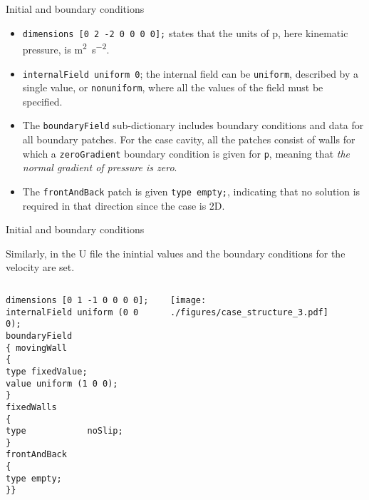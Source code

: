\documentclass{beamer}
\begin{document}
\begin{frame}{Initial and boundary conditions}
\vspace{-0.2cm}
\begin{itemize}
\item \texttt{dimensions [0 2 -2 0 0 0 0];} states that the units of p, here kinematic pressure, is \si{\square\m\per\square\s}.
\item \texttt{internalField uniform 0}; the internal field can be \texttt{uniform}, described by a single value, or \texttt{nonuniform}, where all the values of the field must be specified.
\item The \texttt{boundaryField} sub-dictionary includes boundary conditions and data for all boundary patches. For the case cavity, all the patches consist of walls for which a \texttt{zeroGradient} boundary condition is given for \texttt{p}, meaning that \emph{the normal gradient of pressure is zero}.
\item The \texttt{frontAndBack} patch is given \texttt{type empty;}, indicating that no solution is required in that direction since the case is 2D.
\end{itemize}
\vspace{-0.2cm}


\end{frame}


\begin{frame}[fragile]{Initial and boundary conditions}

Similarly, in the U file the inintial values and the boundary conditions for the velocity are set.
\vspace{-0.3cm}
\begin{columns}[c]
\column{7.0cm} 
\begin{footnotesize}
\begin{verbatim}
dimensions [0 1 -1 0 0 0 0];
internalField uniform (0 0 0);
boundaryField
{ movingWall
{
type fixedValue;
value uniform (1 0 0);
}
fixedWalls
{
type            noSlip;
}
frontAndBack
{
type empty;
}}
\end{verbatim}
\end{footnotesize}
\column{4.0cm} 
\begin{center}\texttt{[image: ./figures/case\_structure\_3.pdf]}\end{center}
\end{columns}



\end{frame}
\end{document}
